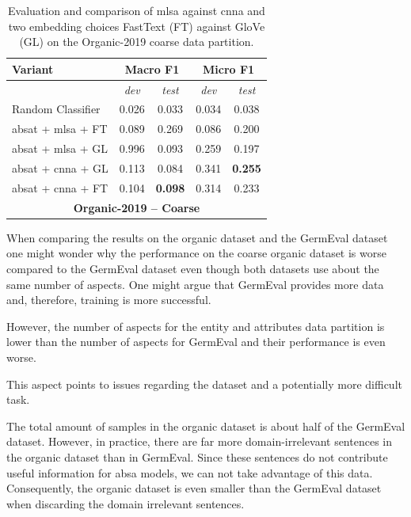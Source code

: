 \begin{table}[htb]
    \centering
    \begin{tabular*}{\textwidth}{l@{\extracolsep{\fill}}cccc@{}}
    \toprule
    Variant          & \multicolumn{2}{c}{\textbf{Macro F1}}     & \multicolumn{2}{c}{\textbf{Micro F1}}       \\ 
    \midrule
                     & \textit{dev}          & \textit{test}         & \textit{dev}              & \textit{test}         \\
    \midrule

    Random Classifier                  &  0.026         & 0.033&  0.034 &   0.038                  \\
    \gls{absat} + \gls{mlsa} + FT    & 0.089     & 0.269    &  0.086 &   0.200               \\ 
    \gls{absat} + \gls{mlsa} + GL    & 0.996     & 0.093    &  0.259 &   0.197               \\ 

    \gls{absat} + \gls{cnna} + GL   & 0.113     & 0.084    & 0.341   &  \textbf{0.255}                 \\     
    \gls{absat} + \gls{cnna} + FT   & 0.104     & \textbf{0.098} & 0.314  &   0.233                \\ 
    \bottomrule
    \multicolumn{5}{c}{\textbf{Organic-2019 -- Coarse}} \\
    \end{tabular*}
    \caption{Evaluation and comparison of \acrfull{mlsa} against \acrfull{cnna} and two embedding choices FastText {(FT)} against GloVe {(GL)} on the Organic-2019 coarse data partition.}
    \label{tab:06_resultsOrganic2}
\end{table}

When comparing the results on the organic dataset and the GermEval dataset one might wonder why the performance on the coarse organic dataset is worse compared to the GermEval dataset even though both datasets use about the same number of aspects. One might argue that GermEval provides more data and, therefore, training is more successful.

However, the number of aspects for the entity and attributes data partition is lower than the number of aspects for GermEval and their performance is even worse.

This aspect points to issues regarding the dataset and a potentially more difficult task. 
\medskip

The total amount of samples in the organic dataset is about half of the GermEval dataset. However, in practice, there are far more domain-irrelevant sentences in the organic dataset than in GermEval. Since these sentences do not contribute useful information for \gls{absa} models, we can not take advantage of this data. Consequently, the organic dataset is even smaller than the GermEval dataset when discarding the domain irrelevant sentences.
\medskip


